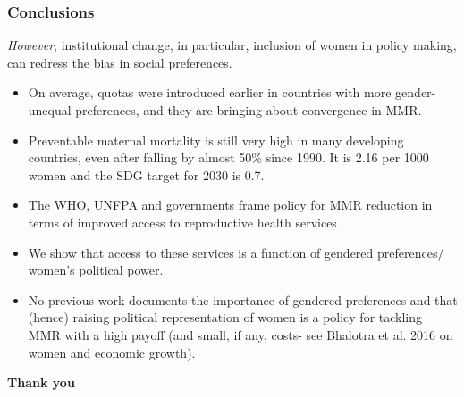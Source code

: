 \documentclass[9pt,letterpaper,subeqn]{beamer}
\begin{document}
\begin{frame}
  \frametitle{Conclusions}
  \emph{However}, institutional change, in particular, inclusion of women in policy making, can redress the bias in social preferences. \\
  \vspace{3mm}
  \begin{itemize}
  \item On average, quotas were introduced earlier in countries with more gender-unequal preferences, and they are bringing about convergence in MMR. 
  \item Preventable maternal mortality is still very high in many developing 
    countries, even after falling by almost 50\% since 1990. It is 2.16 per 1000 women and the SDG target for 2030 is 0.7.
\item The WHO, UNFPA and governments frame policy for MMR reduction in terms of improved access to reproductive health services
\item We show that access to these services is a function of gendered preferences/ women's political power.
\item No previous work documents the importance of gendered preferences and that (hence) raising political representation of women is a policy for tackling MMR with a high payoff (and small, if any, costs- see Bhalotra et al. 2016 on women and economic growth).   
  \end{itemize}
\end{frame}


\begin{frame}[plain]
\begin{center}
\textbf{Thank you}
\end{center}
\end{frame}
\end{document}
